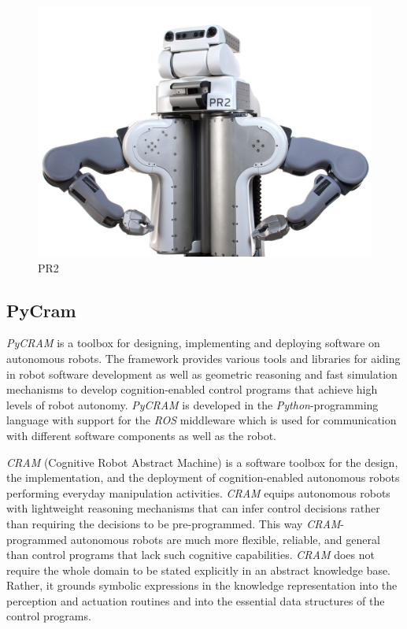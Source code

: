     \begin{figure}[H]
    \includegraphics[scale=0.1]{Graphics/pr2.jpg}
	\caption{PR2 \cite{pr2}}
    \end{figure}

    \subsection{PyCram}
	\label{sec:pycram}
	\textit{PyCRAM} \cite{pycram} is a toolbox for designing, implementing and deploying software on autonomous robots. The framework provides various tools and libraries for aiding in robot software development as well as geometric reasoning and fast simulation mechanisms to develop cognition-enabled control programs that achieve high levels of robot autonomy.
    \textit{PyCRAM} \cite{pycram} is developed in the \textit{Python}-programming language with support for the \textit{ROS} \cite{ros} middleware which is used for communication with different software components as well as the robot.
    
    \textit{CRAM} \cite{beetz10cram} (Cognitive Robot Abstract Machine) is a software toolbox for the design, the implementation, and the deployment of cognition-enabled autonomous robots performing everyday manipulation activities.
	\textit{CRAM} \cite{beetz10cram} equips autonomous robots with lightweight reasoning mechanisms that can infer control decisions rather than requiring the decisions to be pre-programmed. 
	This way \textit{CRAM}-programmed autonomous robots are much more flexible, reliable, and general than control programs that lack such cognitive capabilities. 
	\textit{CRAM} \cite{beetz10cram} does not require the whole domain to be stated explicitly in an abstract knowledge base. Rather, it grounds symbolic expressions in the knowledge representation into the perception and actuation routines and into the essential data structures of the control programs. 

